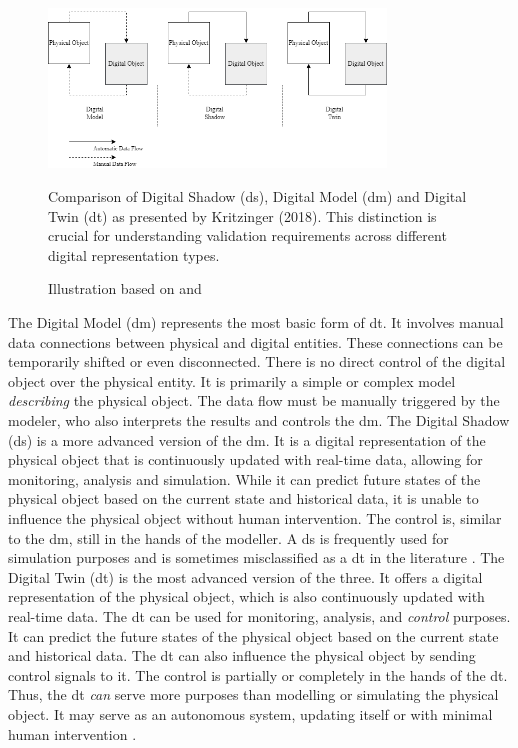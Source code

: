 \begin{figure}[htbp]
  \centering
  \includegraphics[width=0.8\textwidth]{figures/kritzinger.png}
  \caption[The different Types of Digital Models.]{Comparison of Digital Shadow (\gls{ds}), Digital Model (\gls{dm}) and Digital Twin (\gls{dt}) as presented by Kritzinger (2018). This distinction is crucial for understanding validation requirements across different digital representation types.}
  \label{fig:Kritzinger}
  \caption*{Illustration based on \textcite{kritzinger2018digital} and \textcite{Zhang2021jmsy}}
\end{figure}

The Digital Model (\gls{dm}) represents the most basic form of \gls{dt}. It involves manual data connections between physical and digital entities. These connections can be temporarily shifted or even disconnected. There is no direct control of the digital object over the physical entity. It is primarily a simple or complex model \textit{describing} the physical object. The data flow must be manually triggered by the modeler, who also interprets the results and controls the \gls{dm}.
The Digital Shadow (\gls{ds}) is a more advanced version of the \gls{dm}. It is a digital representation of the physical object that is continuously updated with real-time data, allowing for monitoring, analysis and simulation. While it can predict future states of the physical object based on the current state and historical data, it is unable to influence the physical object without human intervention. The control is, similar to the \gls{dm}, still in the hands of the modeller. A \gls{ds} is frequently used for simulation purposes and is sometimes misclassified as a \gls{dt} in the literature \autocite{kritzinger2018digital,sepasgozar2021differentiating}.
The Digital Twin (\gls{dt}) is the most advanced version of the three. It offers a digital representation of the physical object, which is also continuously updated with real-time data. The \gls{dt} can be used for monitoring, analysis, and \textit{control} purposes. It can predict the future states of the physical object based on the current state and historical data. The \gls{dt} can also influence the physical object by sending control signals to it. The control is partially or completely in the hands of the \gls{dt}. Thus, the \gls{dt} \textit{can} serve more purposes than modelling or simulating the physical object. It may serve as an autonomous system, updating itself or with minimal human intervention \autocite{kritzinger2018digital}.

